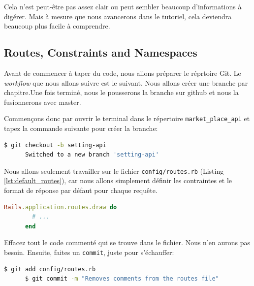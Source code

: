 \documentclass[]{report}
\begin{document}
    Cela n'est peut-être pas assez clair ou peut sembler beaucoup d'informations à digérer. Mais à mesure que nous avancerons dans le tutoriel, cela deviendra beaucoup plus facile à comprendre.

    \subsection{Routes, Constraints and Namespaces}\label{subsec:routes_constraints_namespaces}

      Avant de commencer à taper du code, nous allons préparer le réprtoire Git. Le \textit{workflow} que nous allons suivre est le suivant. Nous allons créer une branche par chapitre.Une fois terminé, nous le pousserons la branche sur github et nous la fusionnerons avec master.

      Commençons donc par ouvrir le terminal dans le répertoire \verb|market_place_api| et tapez la commande suivante pour créer la branche:

      \begin{scriptsize}
      \begin{lstlisting}[language=bash]
      $ git checkout -b setting-api
      Switched to a new branch 'setting-api'
      \end{lstlisting}
      \end{scriptsize}

      Nous allons seulement travailler sur le fichier \verb|config/routes.rb| (Listing \ref{lst:default_routes}), car nous allons simplement définir les contraintes et le format de réponse par défaut pour chaque requête.

      \begin{scriptsize}
      \begin{lstlisting}[language=ruby, caption={Le fichier routes.rb par défault}, label={lst:default_routes}]
      Rails.application.routes.draw do
        # ...
      end
      \end{lstlisting}
      \end{scriptsize}

      Effacez tout le code commenté qui se trouve dans le fichier. Nous n'en aurons pas besoin. Ensuite, faites un \verb|commit|, juste pour s'échauffer:

      \begin{scriptsize}
      \begin{lstlisting}[language=bash]
      $ git add config/routes.rb
      $ git commit -m "Removes comments from the routes file"
      \end{lstlisting}
      \end{scriptsize}
\end{document}
